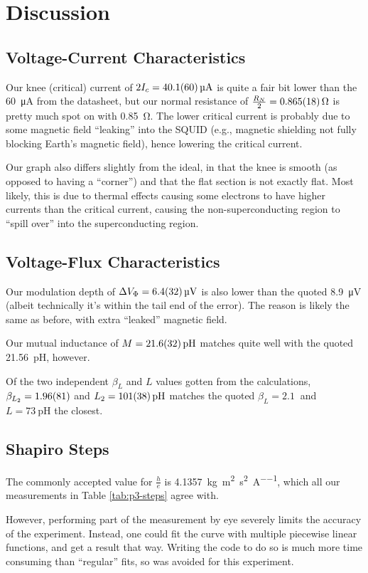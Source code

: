 \documentclass[a4paper]{scrartcl}
\begin{document}
\section{Discussion}
\subsection{Voltage-Current Characteristics}
Our knee (critical) current of \(2 I_c = \SI{40.1 \pm 6.0}{\micro\ampere}\) is quite a fair bit lower than the \SI{60}{\micro\ampere} from the datasheet, but our normal resistance of \(\frac{R_N}{2} = \SI{0.865 \pm 0.018}{\ohm}\) is pretty much spot on with \SI{0.85}{\ohm}. The lower critical current is probably due to some magnetic field ``leaking'' into the SQUID (e.g., magnetic shielding not fully blocking Earth's magnetic field), hence lowering the critical current.

Our graph also differs slightly from the ideal, in that the knee is smooth (as opposed to having a ``corner'') and that the flat section is not exactly flat. Most likely, this is due to thermal effects causing some electrons to have higher currents than the critical current, causing the non-superconducting region to ``spill over'' into the superconducting region.

\subsection{Voltage-Flux Characteristics}
Our modulation depth of \(\Delta V_\Phi = \SI{6.4 \pm 3.2}{\micro\volt}\) is also lower than the quoted \SI{8.9}{\micro\volt} (albeit technically it's within the tail end of the error). The reason is likely the same as before, with extra ``leaked'' magnetic field.

Our mutual inductance of \(M = \SI{21.6 \pm 3.2}{\pico\henry}\) matches quite well with the quoted \SI{21.56}{\pico\henry}, however.

Of the two independent \(\beta_L\) and \(L\) values gotten from the calculations, \(\beta_{L_2} = \SI{1.96 \pm 0.81}{}\) and \(L_2 = \SI{101 \pm 38}{\pico\henry}\) matches the quoted \(\beta_L = \SI{2.1}{}\) and \(L = \SI{73}{\pico\henry}\) the closest.

\subsection{Shapiro Steps}
The commonly accepted value for \(\frac{h}{e}\) is \SI{4.1357}{\kilo\gram\metre\squared\per\second\squared\per\ampere}, which all our measurements in Table \ref{tab:p3-steps} agree with.

However, performing part of the measurement by eye severely limits the accuracy of the experiment. Instead, one could fit the curve with multiple piecewise linear functions, and get a result that way. Writing the code to do so is much more time consuming than ``regular'' fits, so was avoided for this experiment.
\end{document}

